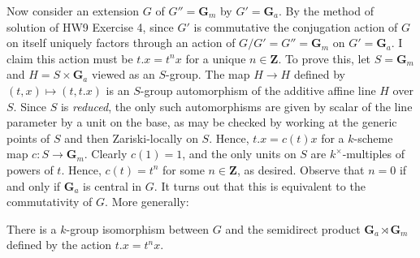 \documentclass[10pt]{article}
\renewcommand{\(}{\left(}
\renewcommand{\)}{\right)}
\numberwithin{thm}{subsection}
\begin{document}
Now consider an extension $G$ of $G'' = \mathbf{G}_m$ by $G' = \mathbf{G}_a$.
By the method of solution of HW9 Exercise 4, since $G'$ is commutative the 
conjugation action of $G$ on itself uniquely factors through an action of
$G/G' = G'' = \mathbf{G}_m$ on $G' = \mathbf{G}_a$. 
I claim this action must be $t.x = t^n x$ for a unique $n \in {\mathbf{Z}}$.
To prove this, let $S = \mathbf{G}_m$ and $H = S \times \mathbf{G}_a$ viewed
as an $S$-group.  The map $H \rightarrow H$ defined by $(t,x)\mapsto (t,t.x)$
is an $S$-group automorphism of the additive affine line $H$ over $S$.
Since $S$ is {\em reduced}, the only such automorphisms are
given by scalar of the line parameter by a unit on the base, as may be checked
by working at the generic points of $S$ and then Zariski-locally on $S$. 
Hence, $t.x = c(t)x$ for a $k$-scheme map $c:S 
\rightarrow \mathbf{G}_m$.  Clearly $c(1) = 1$, and the only units on
$S$ are $k^{\times}$-multiples of powers of $t$.  Hence,
$c(t) = t^n$ for some $n \in {\mathbf{Z}}$, as desired.
Observe that $n = 0$ if and only if $\mathbf{G}_a$ is central in $G$. 
It turns out that this is equivalent to the commutativity of $G$.  More generally: 

\begin{proposition}\label{gmga}
There is a $k$-group isomorphism between
$G$ and the semidirect product $\mathbf{G}_a \rtimes \mathbf{G}_m$
defined by the action $t.x = t^n x$.
\end{proposition}
\end{document}
